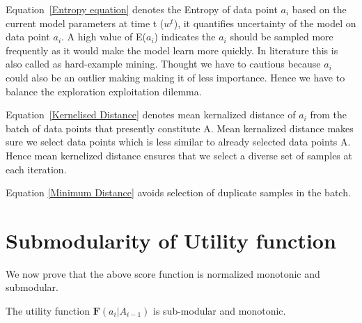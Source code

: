 \documentclass[a4paper,twoside]{iiththesis}
\theoremstyle{definition}
\theoremstyle{definition}
\theoremstyle{remark}
\begin{document}
Equation~\ref{Entropy equation} denotes the Entropy of data point $a_i$ based on the current model parameters at time t ($w^t$), it quantifies uncertainty of the model on data point $a_i$. A high value of E($a_i$)
indicates the $a_i$ should be sampled more frequently as it would make the model learn more quickly. In literature this is also called as hard-example mining. Thought we have to cautious because $a_i$ could also be an outlier making making it of less importance. Hence we have to balance the exploration exploitation dilemma. 

Equation~\ref{Kernelised Distance} denotes mean kernalized distance of $a_i$ from the batch of data points that presently constitute A. Mean kernalized distance makes sure we select data points which is less similar to already selected data points A. Hence mean kernelized distance ensures that we select a diverse set of samples at each iteration.

Equation \ref{Minimum Distance} avoids selection of duplicate samples in the batch.

\section{Submodularity of Utility function}

We now prove that the above score function is normalized monotonic and submodular. \\
\begin{lemma}
The utility function $\mathbf{F}(a_i | A_{i-1})$ is sub-modular and monotonic.
\end{lemma}
\end{document}
